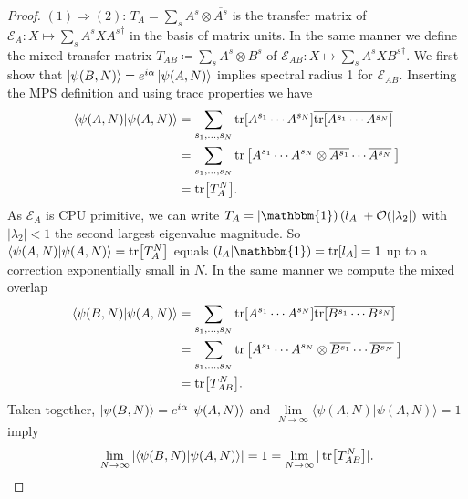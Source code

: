 \begin{proof}
\noindent $(1) \Rightarrow (2)$: $T_A = \sum_s A^s \otimes \overline{A^s}$ is the transfer matrix of $\mathcal{E}_A: X \mapsto \sum_s A^s X {A^s}^{\dagger}$ in the basis of matrix units. In the same manner we define the mixed transfer matrix $T_{AB} \coloneqq \sum_s A^s \otimes \overline{B^s}$ of $\mathcal{E}_{AB}: X \mapsto \sum_s A^s X {B^s}^{\dagger}$. We first show that $\ket{\psi(B,N)} = e^{i \alpha} \ket{\psi(A,N)}$ implies spectral radius 1 for $\mathcal{E}_{AB}$. Inserting the MPS definition and using trace properties we have
\begin{align}
\begin{split}
	\langle \psi(A,N) \vert \psi(A,N) \rangle &= \sum_{s_1, \ldots, s_N} \tr[A^{s_1} \cdots A^{s_N}] \overline{\tr[A^{s_1} \cdots A^{s_N}]} \\
	&= \sum_{s_1, \ldots, s_N} \tr\left[A^{s_1} \cdots A^{s_N} \otimes \overline{A^{s_1}} \cdots \overline{A^{s_N}}\:\right] \\
	&= \tr[T_A^N].
\end{split}
\end{align}
As $\mathcal{E}_A$ is CPU primitive, we can write $T_A = \tket{\mathbbm{1}} \tbra{l_A} + \mathcal{O}(\vert \lambda_2 \vert)$ with $\vert \lambda_2 \vert < 1$ the second largest eigenvalue magnitude. So $\langle \psi(A,N) \vert \psi(A,N) \rangle = \tr[T_A^N]$ equals  $( l_A \vert \mathbbm{1} ) = \tr[l_A] = 1$ up to a correction exponentially small in $N$. In the same manner we compute the mixed overlap
\begin{align}
\begin{split}
	\langle \psi(B,N) \vert \psi(A,N) \rangle &= \sum_{s_1, \ldots, s_N} \tr[A^{s_1} \cdots A^{s_N}]\overline{\tr[B^{s_1} \cdots B^{s_N}]} \\
	&= \sum_{s_1, \ldots, s_N} \tr\left[A^{s_1} \cdots A^{s_N} \otimes \overline{B^{s_1}} \cdots \overline{B^{s_N}}\:\right] \\
	&= \tr[T_{AB}^N].
\end{split}
\end{align}
Taken together, $\ket{\psi(B,N)} = e^{i \alpha} \ket{\psi(A,N)}$ and $\lim\limits_{N \to \infty} \langle \psi(A,N) \vert \psi(A,N) \rangle = 1$ imply 
\begin{equation}
	\lim\limits_{N \to \infty} \vert \langle \psi(B,N) \vert \psi(A,N) \rangle \vert = 1 = \lim\limits_{N \to \infty} \vert \tr[T_{AB}^N] \vert.
\end{equation}


\end{proof}
